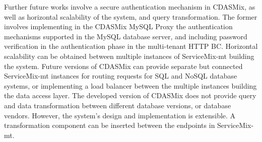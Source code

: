 Further future works involve a secure authentication mechanism in CDASMix, as well as horizontal scalability of the system, and query transformation. The former involves implementing in the CDASMix MySQL Proxy the authentication mechanisms supported in the MySQL database server, and including password verification in the authentication phase in the multi-tenant \ac{HTTP} \ac{BC}. Horizontal scalability can be obtained between multiple instances of ServiceMix-mt building the system. Future versions of CDASMix can provide separate but connected ServiceMix-mt instances for routing requests for \ac{SQL} and \ac{NoSQL} database systems, or implementing a load balancer between the multiple instances building the data access layer. The developed version of CDASMix does not provide query and data transformation between different database versions, or database vendors. However, the system's design and implementation is extensible. A transformation component can be inserted between the endpoints in ServiceMix-mt.





